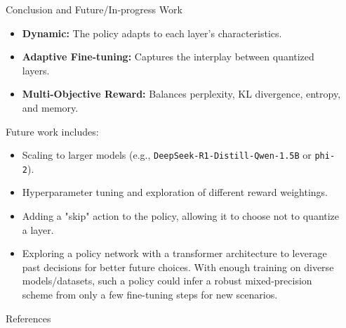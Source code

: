 \documentclass[final]{beamer}
\newlength{\sepwidth}
\newlength{\colwidth}
\newcommand{\separatorcolumn}{\begin{column}{\sepwidth}\end{column}}
\begin{document}
\begin{frame}[t]
\begin{columns}[t]
\begin{column}{\colwidth}
\begin{block}{Conclusion and Future/In-progress Work}
					\begin{itemize}
						\item \textbf{Dynamic:}  The policy adapts to each layer's characteristics.
						\item \textbf{Adaptive Fine-tuning:} Captures the interplay between quantized layers.
						\item \textbf{Multi-Objective Reward:}  Balances perplexity, KL divergence, entropy, and memory.
					\end{itemize}
					
					Future work includes:
					\begin{itemize}
						\item Scaling to larger models (e.g., \texttt{DeepSeek-R1-Distill-Qwen-1.5B} or \texttt{phi-2}).
						\item Hyperparameter tuning and exploration of different reward weightings.
						\item Adding a "skip" action to the policy, allowing it to choose not to quantize a layer.
						\item Exploring a policy network with a transformer architecture to leverage past decisions for better future choices. With enough training on diverse models/datasets, such a policy could infer a robust mixed-precision scheme from only a few fine-tuning steps for new scenarios.
					\end{itemize}
				\end{block}
				
				\begin{block}{References}
					\balance					
					\printbibliography
				\end{block}
				
			\end{column}
			
			\separatorcolumn
		\end{columns}
	\end{frame}
	
\end{document}
